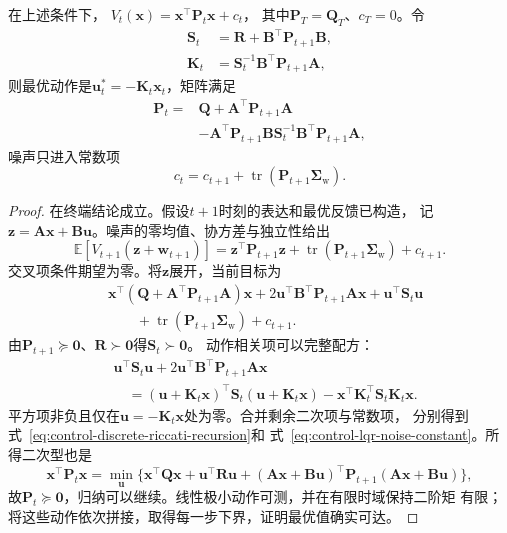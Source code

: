 \begin{theorem}[有限时域LQR与Riccati递推]
\label{thm:control-finite-horizon-lqr}
在上述条件下，
$V_t(\bm x)=\bm x^\top\bm P_t\bm x+c_t$，
其中$\bm P_T=\bm Q_T$、$c_T=0$。令
\begin{equation}
  \begin{aligned}
    \bm S_t&=\bm R+\bm B^\top\bm P_{t+1}\bm B,\\
    \bm K_t&=\bm S_t^{-1}\bm B^\top\bm P_{t+1}\bm A,
  \end{aligned}
  \label{eq:control-lqr-gain}
\end{equation}
则最优动作是$\bm u_t^\ast=-\bm K_t\bm x_t$，矩阵满足
\begin{equation}
  \begin{aligned}
  \bm P_t={}&\bm Q+\bm A^\top\bm P_{t+1}\bm A\\
       &-\bm A^\top\bm P_{t+1}\bm B\bm S_t^{-1}
                    \bm B^\top\bm P_{t+1}\bm A,
  \end{aligned}
  \label{eq:control-discrete-riccati-recursion}
\end{equation}
噪声只进入常数项
\begin{equation}
  c_t=c_{t+1}+\operatorname{tr}(\bm P_{t+1}\bm\Sigma_{\mathrm w}).
  \label{eq:control-lqr-noise-constant}
\end{equation}
\end{theorem}
\begin{proof}
在终端结论成立。假设$t+1$时刻的表达和最优反馈已构造，
记$\bm z=\bm A\bm x+\bm B\bm u$。噪声的零均值、协方差与独立性给出
\[
  \mathbb E[V_{t+1}(\bm z+\bm w_{t+1})]
  =\bm z^\top\bm P_{t+1}\bm z+
    \operatorname{tr}(\bm P_{t+1}\bm\Sigma_{\mathrm w})+c_{t+1}.
\]
交叉项条件期望为零。将$\bm z$展开，当前目标为
\begin{align*}
  &\bm x^\top(\bm Q+\bm A^\top\bm P_{t+1}\bm A)\bm x
   +2\bm u^\top\bm B^\top\bm P_{t+1}\bm A\bm x
   +\bm u^\top\bm S_t\bm u\\
  &\qquad+\operatorname{tr}(\bm P_{t+1}\bm\Sigma_{\mathrm w})+c_{t+1}.
\end{align*}
由$\bm P_{t+1}\succeq\bm0$、$\bm R\succ\bm0$得$\bm S_t\succ\bm0$。
动作相关项可以完整配方：
\begin{align*}
  &\bm u^\top\bm S_t\bm u+
       2\bm u^\top\bm B^\top\bm P_{t+1}\bm A\bm x\\
  &\quad=(\bm u+\bm K_t\bm x)^\top\bm S_t(\bm u+\bm K_t\bm x)
       -\bm x^\top\bm K_t^\top\bm S_t\bm K_t\bm x.
\end{align*}
平方项非负且仅在$\bm u=-\bm K_t\bm x$处为零。合并剩余二次项与常数项，
分别得到式~\eqref{eq:control-discrete-riccati-recursion}和
式~\eqref{eq:control-lqr-noise-constant}。所得二次型也是
\[
  \bm x^\top\bm P_t\bm x
  =\min_{\bm u}\{
   \bm x^\top\bm Q\bm x+\bm u^\top\bm R\bm u+
   (\bm A\bm x+\bm B\bm u)^\top\bm P_{t+1}(\bm A\bm x+\bm B\bm u)\},
\]
故$\bm P_t\succeq\bm0$，归纳可以继续。线性极小动作可测，并在有限时域保持二阶矩
有限；将这些动作依次拼接，取得每一步下界，证明最优值确实可达。
\end{proof}

